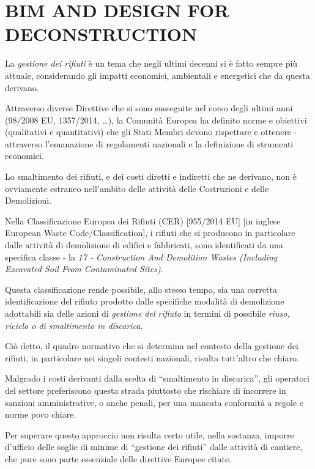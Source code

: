 \section{\uppercase{BIM and Design for Deconstruction}}
\label{sec:deconstruction}


La  \textit{gestione dei rifiuti} \`e un tema che negli ultimi decenni si \`e fatto sempre pi\`u  attuale, considerando gli impatti economici, ambientali e energetici che da questa derivano.
 
Attraverso diverse Direttive che si sono susseguite nel corso degli ultimi anni (98/2008 EU, 1357/2014, …), la Comunit\`a Europea ha definito norme e obiettivi (qualitativi e quantitativi) che gli Stati Membri devono rispettare e ottenere - attraverso l’emanazione di regolamenti nazionali e la definizione di strumenti economici.
 
Lo smaltimento dei rifiuti, e dei costi diretti e indiretti che ne derivano, non \`e ovviamente estraneo nell’ambito delle attività delle Costruzioni e delle Demolizioni.
  
Nella Classificazione Europea dei Rifiuti (CER) [955/2014 EU] [in inglese European Waste Code/Classification], i rifiuti che si producono in particolare dalle attivit\`a di demolizione di edifici e fabbricati, sono identificati da una specifica classe - la \textit{17 - Construction And Demolition Wastes (Including Excavated Soil From Contaminated Sites)}.
 
Questa classificazione rende possibile, allo stesso tempo, sia una corretta identificazione del rifiuto prodotto dalle specifiche modalità di demolizione adottabili sia delle azioni di \textit{gestione del rifiuto} in termini di possibile \textit{riuso, riciclo o di smaltimento in discarica}.

Ci\`o detto, il quadro normativo che si determina nel contesto della gestione dei rifiuti, in particolare nei singoli contesti nazionali, risulta tutt’altro che chiaro.

Malgrado i costi derivanti dalla scelta di “smaltimento in discarica”, gli operatori del settore preferiscono questa strada piuttosto che rischiare di incorrere in sanzioni amministrative, o anche penali, per una mancata conformit\`a a regole e norme poco chiare.
 
Per superare questo approccio non risulta certo utile, nella sostanza, imporre d’ufficio delle soglie di minime di “gestione dei rifiuti” dalle attività di cantiere,  che pure sono parte essenziale delle direttive Europee citate.

